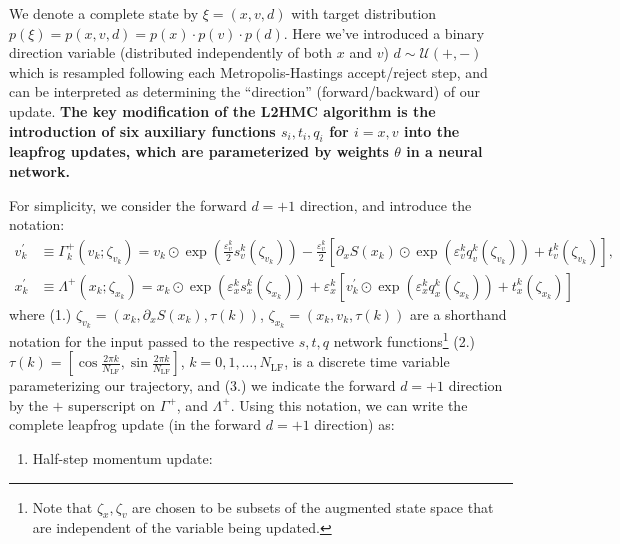 \documentclass{article} %
\begin{document}
{We denote a complete state by \(\xi = (x, v, d)\) with target distribution \(p(\xi) = p(x, v, d) = p(x)\cdot p(v)\cdot
p(d)\).
%
Here we've introduced a binary direction variable (distributed independently of both \(x\) and \(v\))
\(d\sim\mathcal{U}(+,-)\) which is resampled following each Metropolis-Hastings accept/reject step, and can be
interpreted as determining the ``direction'' (forward/backward) of our update.
%
\textbf{The key modification of the L2HMC algorithm is the introduction of six auxiliary functions \(s_{i}, t_{i}, q_{i}\) for \(i
= x, v\) into the leapfrog updates, which are parameterized by weights \(\theta\) in a neural network.}
%
%

For simplicity, we consider the forward \(d=+1\) direction, and introduce the notation:
%
\begin{align}
   v^{\prime}_{k} &\equiv \Gamma^{+}_{k}(v_{k};\zeta_{v_{k}})
   = v_{k}\odot \exp{\left(\tfrac{\varepsilon^{k}_{v}}{2}s_{v}^{k}(\zeta_{v_{k}})\right)} -
   \tfrac{\varepsilon^{k}_{v}}{2}{\left[\partial_{x}S(x_{k})\odot\exp{\left(\varepsilon^{k}_{v} q_{v}^{k}(\zeta_{v_{k}})\right)}
      +t_{v}^{k}(\zeta_{v_{k}})\right]},\label{eq:new_momentum_update}\\
   x^{\prime}_{k} &\equiv \Lambda^{+}(x_{k};\zeta_{x_{k}})
   = x_{k}\odot\exp(\varepsilon^{k}_{x} s^{k}_{x}(\zeta_{x_{k}}))
   + \varepsilon^{k}_{x}\left[v^{\prime}_{k}\odot\exp(\varepsilon^{k}_{x} q^{k}_{x}(\zeta_{x_{k}}))
         + t^{k}_{x}(\zeta_{x_{k}})\right]\label{eq:new_position_update}
\end{align}
%
where (1.) \(\zeta_{v_{k}} = (x_{k}, \partial_{x}S(x_{k}), \tau(k))\), \(\zeta_{x_{k}} = (x_{k}, v_{k}, \tau(k))\) are a
shorthand notation for the input passed to the respective \(s, t, q\) network functions\footnote{Note that \(\zeta_{x},
\zeta_{v}\) are chosen to be subsets of the augmented state space that are independent of the variable being updated.}
(2.) \(\tau(k) = {\left[\cos\tfrac{2\pi k}{N_{\mathrm{LF}}}, \sin\tfrac{2\pi k}{N_{\mathrm{LF}}}\right]}\), \(k = 0, 1,
\ldots, N_{\mathrm{LF}}\), is a discrete time variable parameterizing our trajectory, and (3.) we indicate the forward
\(d=+1\) direction by the \(+\) superscript on \(\Gamma^{+}\), and \(\Lambda^{+}\).
%
Using this notation, we can write the complete leapfrog update (in the forward \(d=+1\) direction) as:
%
\begin{enumerate}
   \item Half-step momentum update:%

\end{enumerate}}
\end{document}
